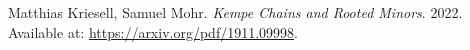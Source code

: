 

\def\bibfont{\hfuzz=2pt}

\printbibliography[heading=bibintoc]


\begin{thebibliography}{99}
  Matthias Kriesell, Samuel Mohr. \textit{Kempe Chains and Rooted Minors}. 2022. Available at: \url{https://arxiv.org/pdf/1911.09998}.
\end{thebibliography}

